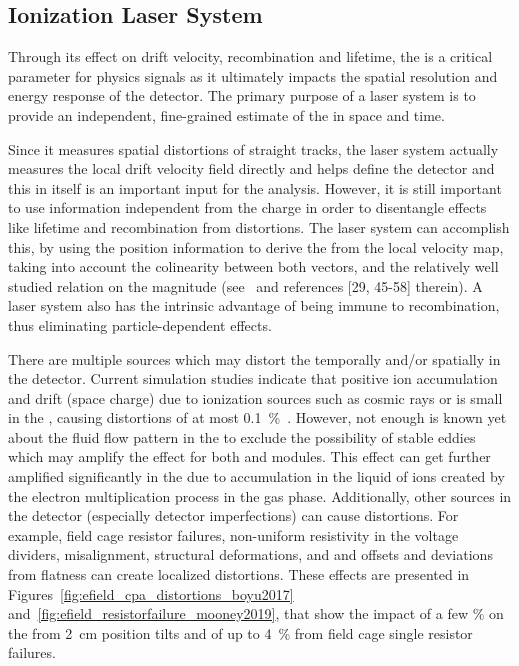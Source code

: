 \subsection{Ionization Laser System}
\label{sec:sp-calib-sys-las-ion}
Through its effect on drift velocity, recombination and lifetime, the \efield is a critical parameter for physics signals as it ultimately impacts the spatial resolution and energy response of the detector. The primary purpose of a laser system is to provide an independent, fine-grained estimate of the \efield in space and time. 

Since it measures spatial distortions of straight tracks, the laser system actually measures the local drift velocity field directly and helps define the detector  and this in itself is an important input for the  analysis. 
However, it is still important to use information independent from the charge in order to disentangle effects like lifetime and recombination from \efield distortions. The laser system can accomplish this, by using the position information to derive the \efield from the local velocity map, taking into account the colinearity between both vectors, and the relatively well studied relation on the magnitude (see~\cite{Li:2015rqa} and references [29, 45-58] therein). A laser system also has the intrinsic advantage of being immune to recombination, thus eliminating particle-dependent effects.  

There are multiple sources which may distort the \efield temporally  and/or spatially in the detector. Current simulation studies indicate that positive ion accumulation and drift (space charge) due to ionization sources such as cosmic rays or  is small in the  , causing \efield distortions of at most \SI{0.1}{\%}~\cite{bib:mooney2018}.
However, not enough is known yet about the fluid flow pattern in the  to exclude the possibility of stable eddies which may amplify the effect for both \single and \dual modules. This effect can get further amplified significantly in the  due to  accumulation in the liquid of ions created by the electron multiplication process in the gas phase.
Additionally, other sources in the detector (especially detector imperfections) can cause \efield distortions. For example, field cage resistor failures, non-uniform resistivity in the voltage dividers,  misalignment,  structural deformations, and  and  offsets and  deviations from flatness can create localized \efield distortions. These effects are presented in Figures~\ref{fig:efield_cpa_distortions_boyu2017} and~\ref{fig:efield_resistorfailure_mooney2019}, that show the impact of a few \% on the \efield from \SI{2}{\cm}  position tilts and of up to \SI{4}{\%} from field cage single resistor failures.

